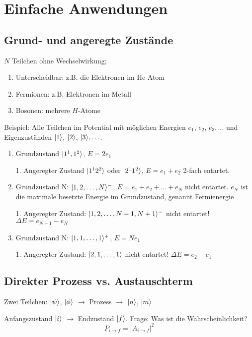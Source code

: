 \documentclass[11pt,a4paper]{report}
\begin{document}
\section{Einfache Anwendungen}

\subsection{Grund- und angeregte Zustände}

$N$ Teilchen ohne Wechselwirkung;
\begin{enumerate}
    \item  Unterscheidbar: z.B. die Elektronen im He-Atom
    \item Fermionen: z.B. Elektronen im Metall
    \item Bosonen: mehrere $H$-Atome
\end{enumerate}

Beispiel: Alle Teilchen im Potential mit möglichen Energien $e_1$, $e_2$, $e_3, \ldots$ und Eigenzuständen $|1\rangle$, $|2\rangle$, $|3\rangle, \ldots$.
\begin{enumerate}
    \item Grundzustand $|1^1, 1^2\rangle$, $E = 2 e_1$

    1. Angeregter Zustand $|1^1 2^2\rangle$ oder $|2^1 1^2\rangle$, $E = e_1 + e_2$ 2-fach entartet.

    \item Grundzustand N: $|1, 2, \ldots, N\rangle^{-}$, $E = e_1 + e_2 + \ldots + e_N$ nicht entartet.
    $e_N$ ist die maximale besetzte Energie im Grundzustand, genannt Fermienergie
    
    1. Angeregter Zustand: $|1,2, \ldots, N-1, N+1\rangle^{-}$ nicht entartet! $\Delta E = e_{N+1} - e_N$
    \item Grundzustand N: $|1, 1, \ldots, 1\rangle^+$, $E = N e_1$
    
    1. Angeregter Zustand: $|2, 1, \ldots, 1\rangle$ nicht entartet! $\Delta E = e_2 - e_1$
\end{enumerate}

\subsection{Direkter Prozess vs. Austauschterm}

Zwei Teilchen: $|\psi\rangle$, $|\phi\rangle$ $\longrightarrow$ Prozess $\longrightarrow$ $|n\rangle$, $|m\rangle$\par 

Anfangszustand $|i\rangle$ $\longrightarrow$ Endzustand $|f\rangle$. Frage: Was ist die Wahrscheinlichkeit?
$$P_{i\rightarrow f} = |A_{i\rightarrow f}|^2$$
\end{document}
